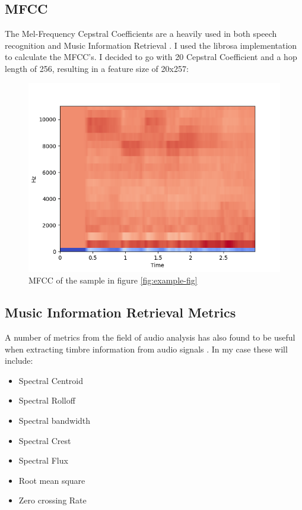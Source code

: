 \documentclass[a4paper, 12pt, twoside]{report}
\begin{document}
\subsection{MFCC}
\label{sec:org70aa9fd}

The Mel-Frequency Cepstral Coefficients are a heavily used in both speech recognition and Music Information Retrieval \cite{medium,klustr,Racharla_2020,article}.
I used the librosa implementation to calculate the MFCC's. I decided to go with 20 Cepstral Coefficient and a hop length of 256, resulting in a feature size of 20x257:

\begin{figure}[H]
\centering
\includegraphics[width=.7\linewidth]{./Figures/mfcc.png}
\caption{\label{fig:mfcc}MFCC of the sample in figure \ref{fig:example-fig}}
\end{figure}

\subsection{Music Information Retrieval Metrics}
\label{sec:orgb3249b0}

A number of metrics from the field of audio analysis has also found to be useful when extracting timbre information from audio signals \cite{article,klustr}. In my case these will include:

\begin{itemize}
\item Spectral Centroid
\item Spectral Rolloff
\item Spectral bandwidth
\item Spectral Crest
\item Spectral Flux
\item Root mean square
\item Zero crossing Rate
\end{itemize}
\end{document}
